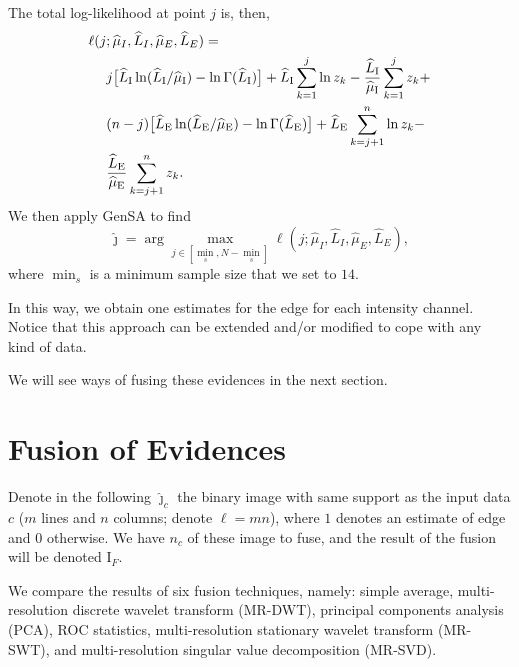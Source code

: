 \documentclass[journal]{IEEEtran}
\begin{document}
The total log-likelihood at point $j$ is, then,
\begin{equation}\label{eq:TotalLogLikelihood}
\begin{split}
\ell(j&;\widehat{\mu}_I, \widehat{L}_I,\widehat{\mu}_E, \widehat{L}_E)=\\
&j \big[\widehat{L}_\text{I}\ln (\widehat{L}_\text{I} / \widehat{\mu}_\text{I}) - \ln \Gamma(\widehat{L}_\text{I})\big]
+\widehat{L}_\text{I} \sum_{k=1}^{j}\ln z_k -\frac{\widehat{L}_\text{I}}{\widehat{\mu}_\text{I}}\sum_{k=1}^{j} z_k +\\
&(n-j) \big[\widehat{L}_\text{E}\ln (\widehat{L}_\text{E} / \widehat{\mu}_\text{E}) - \ln \Gamma(\widehat{L}_\text{E})\big]
+\widehat{L}_\text{E} \sum_{k=j+1}^{n}\ln z_k -\\ &\frac{\widehat{L}_\text{E}}{\widehat{\mu}_\text{E}}\sum_{k=j+1}^{n} z_k.
\raisetag{2.2em}
\end{split}
\end{equation}
We then apply GenSA to find  
$$
\widehat{\jmath}= \arg\max\limits_{j\in [\min_s,N-\min_s]}\ell(j;\widehat{\mu}_I, \widehat{L}_I,\widehat{\mu}_E, \widehat{L}_E),
$$ 
where $\min_s$ is a minimum sample size that we set to $14$.

In this way, we obtain one estimates for the edge for each intensity channel.
Notice that this approach can be extended and/or modified to cope with any kind of data.

We will see ways of fusing these evidences in the next section.

\section{Fusion of Evidences}\label{sec_04}

Denote in the following $\widehat{\bm\jmath}_c$ the binary image with same support as the input data $c$ ($m$ lines and $n$ columns; denote $\ell=mn$), where $1$ denotes an estimate of edge and $0$ otherwise.
We have $n_c$ of these image to fuse, and the result of the fusion will be denoted $\text{I}_F$.

We compare the results of six fusion techniques, namely:
simple average, 
multi-resolution discrete wavelet transform (MR-DWT),
principal components analysis (PCA), 
ROC statistics,
multi-resolution stationary wavelet transform (MR-SWT), and
multi-resolution singular value decomposition (MR-SVD).

\end{document}
